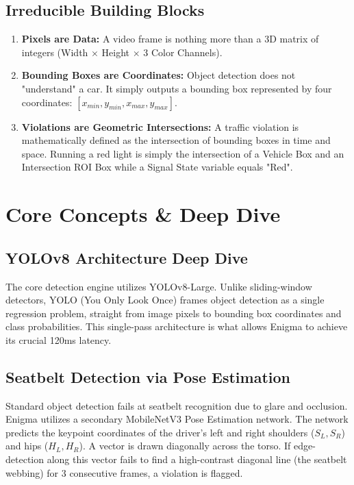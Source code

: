 \documentclass[12pt,a4paper]{article}
\begin{document}
\subsection{Irreducible Building Blocks}
\begin{enumerate}
    \item \textbf{Pixels are Data:} A video frame is nothing more than a 3D matrix of integers (Width $\times$ Height $\times$ 3 Color Channels). 
    \item \textbf{Bounding Boxes are Coordinates:} Object detection does not "understand" a car. It simply outputs a bounding box represented by four coordinates: $[x_{min}, y_{min}, x_{max}, y_{max}]$.
    \item \textbf{Violations are Geometric Intersections:} A traffic violation is mathematically defined as the intersection of bounding boxes in time and space. Running a red light is simply the intersection of a Vehicle Box and an Intersection ROI Box while a Signal State variable equals "Red".
\end{enumerate}

\section{Core Concepts \& Deep Dive}

\subsection{YOLOv8 Architecture Deep Dive}
\indent The core detection engine utilizes YOLOv8-Large. Unlike sliding-window detectors, YOLO (You Only Look Once) frames object detection as a single regression problem, straight from image pixels to bounding box coordinates and class probabilities. This single-pass architecture is what allows Enigma to achieve its crucial 120ms latency.

\subsection{Seatbelt Detection via Pose Estimation}
\indent Standard object detection fails at seatbelt recognition due to glare and occlusion. Enigma utilizes a secondary MobileNetV3 Pose Estimation network. 
\indent The network predicts the keypoint coordinates of the driver's left and right shoulders ($S_L, S_R$) and hips ($H_L, H_R$). A vector is drawn diagonally across the torso. If edge-detection along this vector fails to find a high-contrast diagonal line (the seatbelt webbing) for 3 consecutive frames, a violation is flagged.
\end{document}
